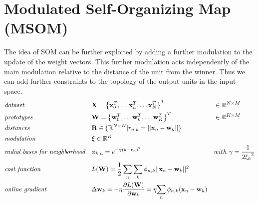 \documentclass[a4paper]{article}
\begin{document}
\pagebreak
\section*{Modulated Self-Organizing Map (MSOM)}
     The idea of SOM can be further exploited by adding a further modulation to the update of the weight vectors. This further modulation acts independently of the main modulation relative to the distance of the unit from the winner. Thus we can add further constraints to the topology of the output units in the input space.
\begin{align}
	& \emph{dataset} && 
    \mathbf{X} = \left\{\mathbf{x}^T_0, \dots\mathbf{x}^T_n, 
    \dots\mathbf{x}^T_N\right\}^T && 
    \in \mathbb{R}^{N\times M} \nonumber\\
	& \emph{prototypes} && 
    \mathbf{W}=\left\{\mathbf{w}^T_0, \dots\mathbf{w}^T_k, 
    \dots\mathbf{w}^T_K\right\}^T &&
    \in \mathbb{R}^{K \times M} \nonumber\\
 	& \emph{distances} &&  
    \mathbf{R}\in\{\mathbb{R}^{N\times K} | r_{n, k} =  || \mathbf{x}_n - \mathbf{w}_k ||\} && \nonumber\\
    & \emph{modulation} && 
    \boldsymbol{\xi} \in \mathbb{R}^{K} && \nonumber\\
    & \emph{radial bases for neighborhood} && 
    {\phi}_{k,n} = e^{{-\gamma (k- r_{n})^2}} && 
    with\ \gamma = \frac{1}{2{\xi_k}^2} \nonumber\\
    & \emph{cost function} &&
    L(\mathbf{W}) = \frac{1}{2}\sum_n\sum_k \phi_{n,k} 
    || \mathbf{x}_n - \mathbf{w}_k||^2  &&\nonumber\\
    & \emph{online gradient} && 
    \Delta{\mathbf{w}_{k}} = -\eta\frac{\partial L(\mathbf{W})}
    {\partial\mathbf{w}_{k}} = \eta{\sum_{n}{ \phi_{n,k} 
    (\mathbf{x}_n - \mathbf{w}_{k})}} &&\nonumber
\end{align}
\end{document}

